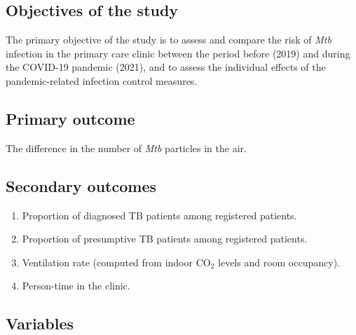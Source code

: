 \documentclass{article}
\begin{document}
\subsection{Objectives of the study}

The primary objective of the study is to assess and compare the risk of \emph{Mtb} infection in the primary care clinic between the period before (2019) and during the COVID-19 pandemic (2021), and to assess the individual effects of the pandemic-related infection control measures. 

\subsection{Primary outcome}

The difference in the number of \emph{Mtb} particles in the air.  


\subsection{Secondary outcomes}

\begin{enumerate}
    \item Proportion of diagnosed TB patients among registered patients.
    \item Proportion of presumptive TB patients among registered patients.
    \item Ventilation rate (computed from indoor CO$_2$ levels and room occupancy).
    \item Person-time in the clinic. 
\end{enumerate}

\subsection{Variables}
\end{document}

